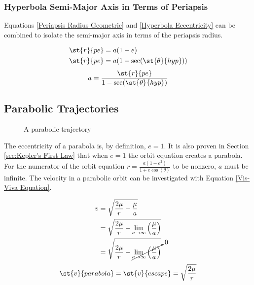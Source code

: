 \documentclass[../basicOrbitalDynamics.tex]{subfiles}
\begin{document}
\subsubsection{Hyperbola Semi-Major Axis in Terms of Periapsis}

Equations \eqref{Periapsis Radius Geometric} and \eqref{Hyperbola Eccentricity} can be combined to isolate the semi-major axis in terms of the periapsis radius.

\begin{align*}
    \st{r}{pe} & =a(1-e)                       \\
    \st{r}{pe} & =a(1-\sec(\st{\theta}{hyp})) \\
\end{align*}
\begin{equation}\label{Hyperbola SMA}
    a=\frac{{\st{r}{pe}}}{1-\sec(\st{\theta}{hyp})}
\end{equation}

\bigskip\bigskip
\subsection{Parabolic Trajectories}\label{sec:Analysis of parabolic trajectories}

\begin{figure}[H]
    \centering
    \caption{A parabolic trajectory}\label{fig:Parabolic Trajectory}
\end{figure}

The eccentricity of a parabola is, by definition, $e=1$. It is also proven in Section \ref{sec:Kepler's First Law} that when $e=1$ the orbit equation creates a parabola. For the numerator of the orbit equation $r=\frac{a(1-e^2)}{1+e\cos(\theta)}$ to be nonzero, $a$ must be infinite. The velocity in a parabolic orbit can be investigated with Equation \eqref{Vis-Viva Equation}.

\begin{align*}
    v & =\sqrt{\frac{2\mu}{r}-\frac{\mu}{a}}                                                     \\
      & =\sqrt{\frac{2\mu}{r}-\lim_{a\rightarrow\infty}\left(\frac{\mu}{a}\right)}               \\
      & =\sqrt{\frac{2\mu}{r}-\cancelto{0}{\lim_{a\rightarrow\infty}\left(\frac{\mu}{a}\right)}} \\
\end{align*}
\begin{equation}
    \st{v}{parabola}=\st{v}{escape}=\sqrt{\frac{2\mu}{r}}
\end{equation}
\end{document}
